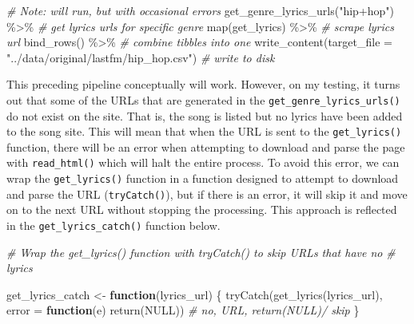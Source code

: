\documentclass[
]{article}
\newenvironment{Shaded}{\begin{snugshade}}{\end{snugshade}}
\newcommand{\AttributeTok}[1]{\textcolor[rgb]{0.77,0.63,0.00}{#1}}
\newcommand{\CommentTok}[1]{\textcolor[rgb]{0.56,0.35,0.01}{\textit{#1}}}
\newcommand{\ConstantTok}[1]{\textcolor[rgb]{0.00,0.00,0.00}{#1}}
\newcommand{\ControlFlowTok}[1]{\textcolor[rgb]{0.13,0.29,0.53}{\textbf{#1}}}
\newcommand{\FunctionTok}[1]{\textcolor[rgb]{0.00,0.00,0.00}{#1}}
\newcommand{\NormalTok}[1]{#1}
\newcommand{\OtherTok}[1]{\textcolor[rgb]{0.56,0.35,0.01}{#1}}
\newcommand{\SpecialCharTok}[1]{\textcolor[rgb]{0.00,0.00,0.00}{#1}}
\newcommand{\StringTok}[1]{\textcolor[rgb]{0.31,0.60,0.02}{#1}}
\begin{document}
\begin{Shaded}
\begin{Highlighting}[]
\CommentTok{\# Note: will run, but with occasional errors}
\FunctionTok{get\_genre\_lyrics\_urls}\NormalTok{(}\StringTok{"hip+hop"}\NormalTok{) }\SpecialCharTok{\%\textgreater{}\%} \CommentTok{\# get lyrics urls for specific genre}
  \FunctionTok{map}\NormalTok{(get\_lyrics) }\SpecialCharTok{\%\textgreater{}\%}  \CommentTok{\# scrape lyrics url}
  \FunctionTok{bind\_rows}\NormalTok{() }\SpecialCharTok{\%\textgreater{}\%} \CommentTok{\# combine tibbles into one}
  \FunctionTok{write\_content}\NormalTok{(}\AttributeTok{target\_file =} \StringTok{"../data/original/lastfm/hip\_hop.csv"}\NormalTok{) }\CommentTok{\# write to disk}
\end{Highlighting}
\end{Shaded}

This preceding pipeline conceptually will work. However, on my testing, it turns out that some of the URLs that are generated in the \texttt{get\_genre\_lyrics\_urls()} do not exist on the site. That is, the song is listed but no lyrics have been added to the song site. This will mean that when the URL is sent to the \texttt{get\_lyrics()} function, there will be an error when attempting to download and parse the page with \texttt{read\_html()} which will halt the entire process. To avoid this error, we can wrap the \texttt{get\_lyrics()} function in a function designed to attempt to download and parse the URL (\texttt{tryCatch()}), but if there is an error, it will skip it and move on to the next URL without stopping the processing. This approach is reflected in the \texttt{get\_lyrics\_catch()} function below.

\begin{Shaded}
\begin{Highlighting}[]
\CommentTok{\# Wrap the \textasciigrave{}get\_lyrics()\textasciigrave{} function with \textasciigrave{}tryCatch()\textasciigrave{} to skip URLs that have no}
\CommentTok{\# lyrics}

\NormalTok{get\_lyrics\_catch }\OtherTok{\textless{}{-}} \ControlFlowTok{function}\NormalTok{(lyrics\_url) \{}
    \FunctionTok{tryCatch}\NormalTok{(}\FunctionTok{get\_lyrics}\NormalTok{(lyrics\_url), }\AttributeTok{error =} \ControlFlowTok{function}\NormalTok{(e) }\FunctionTok{return}\NormalTok{(}\ConstantTok{NULL}\NormalTok{))  }\CommentTok{\# no, URL, return(NULL)/ skip}
\NormalTok{\}}
\end{Highlighting}
\end{Shaded}
\end{document}

